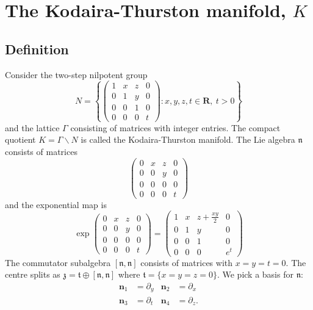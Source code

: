 \documentclass[11pt]{amsart}
\newcommand{\RR}{\mathbf{R}}
\newcommand{\nn}{\mathfrak{n}}
\newcommand{\zz}{\mathfrak{z}}
\renewcommand{\tt}{\mathfrak{t}}
\numberwithin{equation}{section}
\theoremstyle{definition}
\theoremstyle{remark}
\begin{document}

\section{The Kodaira-Thurston manifold, $K$}\label{KT}


\subsection{Definition}

Consider the two-step nilpotent group
\[N=\left\{\left(\begin{array}{cccc}
1 & x & z & 0 \\
0 & 1 & y & 0 \\
0 & 0 & 1 & 0 \\
0 & 0 & 0 & t
\end{array}\right)\colon x,y,z,t\in\RR,\ t>0\right\}\]
and the lattice $\Gamma$ consisting of matrices with integer entries. The compact quotient $K=\Gamma\backslash N$ is called the Kodaira-Thurston manifold. The Lie algebra $\nn$ consists of matrices
\[\left(\begin{array}{cccc}
0 & x & z & 0 \\
0 & 0 & y & 0 \\
0 & 0 & 0 & 0 \\
0 & 0 & 0 & t
\end{array}\right)\]
and the exponential map is
\[\exp\left(\begin{array}{cccc}
0 & x & z & 0 \\
0 & 0 & y & 0 \\
0 & 0 & 0 & 0 \\
0 & 0 & 0 & t
\end{array}\right)=\left(\begin{array}{cccc}
1 & x & z+\frac{xy}{2} & 0 \\
0 & 1 & y & 0 \\
0 & 0 & 1 & 0 \\
0 & 0 & 0 & e^t
\end{array}\right)\]
The commutator subalgebra $[\nn,\nn]$ consists of matrices with $x=y=t=0$. The centre splits as $\zz=\tt\oplus[\nn,\nn]$ where $\tt=\{x=y=z=0\}$. We pick a basis for $\nn$:
\begin{align*}
\mathbf{n}_1&=\partial_y & \mathbf{n}_2&=\partial_x\\
\mathbf{n}_3&=\partial_t & \mathbf{n}_4&=\partial_z.
\end{align*}
\end{document}
